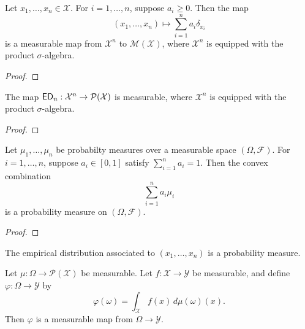 \begin{lemma}
  \label{lem:sum_of_dirac_measures_measurable}
  \notready
  Let $x_1, \dots, x_n \in \mathcal{X}$. For $i= 1, \dots, n$, suppose $a_i \geq 0$. Then the map
  \[
  (x_1, \dots, x_n) \mapsto \sum_{i=1}^n a_i \delta_{x_i}
  \]
  is a measurable map from $\mathcal{X}^n$ to $\mathcal{M}(\mathcal{X})$, where $\mathcal{X}^n$ is equipped with the product $\sigma$-algebra.
\end{lemma}

\begin{proof}
  \uses{}
  \notready
\end{proof}

\begin{lemma}
  \label{lem:empiricalDistribution_map_measurable}
  \notready
  The map ${\sf ED}_n :\mathcal{X}^n \to \mathcal{P}(\mathcal{X})$ is measurable, where $\mathcal{X}^n$ is equipped with the product $\sigma$-algebra.
\end{lemma}

\begin{proof}
  \uses{}
  \notready
\end{proof}


\begin{lemma}
  \label{lem:convex_combination_prob_measure_prob_measure}
  \uses{}
  \notready
  Let $\mu_1, \dots, \mu_n$ be probabilty measures over a measurable space $(\Omega, \mathcal{F})$. For $i = 1, \dots, n$, suppose $a_i \in [0,1]$ satisfy $\sum_{i=1}^{n} a_i = 1$. Then the convex combination
  \[
  \sum_{i=1}^n a_i \mu_i
  \]
  is a probability measure on $(\Omega, \mathcal{F})$.
\end{lemma}

\begin{proof}
  \uses{}
  \notready
\end{proof}

\begin{lemma}
  \label{lem:empiricalDistribution_probability_measure}
  \notready
  The empirical distribution associated to $(x_1, \dots, x_n)$ is a probability measure.
\end{lemma}



\begin{lemma}
  \label{lem:random_dist_test_function_measurable}
  \notready
  Let $\mu : \Omega \to \mathcal{P}(\mathcal{X})$ be measurable. Let $f : \mathcal{X} \to \mathcal{Y}$ be measurable, and define $\varphi : \Omega \to \mathcal{Y}$ by
  \[
  \varphi(\omega) = \int_{\mathcal{X}}f(x) \, d\mu(\omega)(x).
  \]
  Then $\varphi$ is a measurable map from $\Omega \to \mathcal{Y}$.

\end{lemma}

